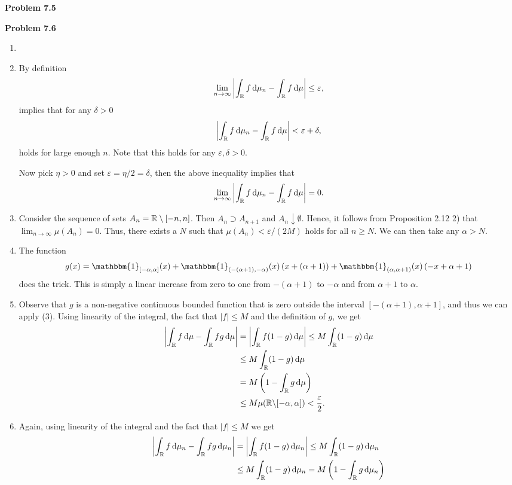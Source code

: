 \bigskip

\textbf{Problem 7.5}

\bigskip

\textbf{Problem 7.6}

\begin{enumerate}[label={(\alph*)}]
\item 
\item By definition
\[
	\lim_{n\to\infty} \left|\int_{\mathbb R} f \, \mathrm{d} \mu_n - \int_{\mathbb R} f \, \mathrm{d} \mu\right| \le \varepsilon,
\]
implies that for any $\delta > 0$
\[
	\left|\int_{\mathbb R} f \, \mathrm{d} \mu_n - \int_{\mathbb R} f \, \mathrm{d} \mu\right| < \varepsilon + \delta,
\]
holds for large enough $n$. Note that this holds for any $\varepsilon, \delta > 0$.

Now pick $\eta > 0$ and set $\varepsilon = \eta/2 = \delta$, then the above inequality implies that
\[
	\lim_{n\to\infty} \left|\int_{\mathbb R} f \, \mathrm{d} \mu_n - \int_{\mathbb R} f \, \mathrm{d} \mu\right| = 0.
\]

\item Consider the sequence of sets $A_n = \mathbb R\setminus [-n,n]$. Then $A_n \supset A_{n + 1}$ and $A_n \downarrow \emptyset$. Hence, it follows from Proposition 2.12 2) that $\lim_{n \to \infty} \mu(A_n) = 0$. Thus, there exists a $N$ such that $\mu(A_n) < \varepsilon/(2M)$ holds for all $n \ge N$. We can then take any $\alpha > N$.
\item The function
\[
	g(x) = \mathbbm{1}_{[-\alpha,\alpha]}(x) + \mathbbm{1}_{(-(\alpha+1), -\alpha)}(x)\left(x + (\alpha + 1)\right) + \mathbbm{1}_{(\alpha,\alpha+1)}(x)\left(-x + \alpha + 1\right)
\]
does the trick. This is simply a linear increase from zero to one from $-(\alpha + 1)$ to $-\alpha$ and from $\alpha + 1$ to $\alpha$.
\item Observe that $g$ is a non-negative continuous bounded function that is zero outside the interval $[-(\alpha+1), \alpha+1]$, and thus we can apply (3).
Using linearity of the integral, the fact that $|f| \le M$ and the definition of $g$, we get
\begin{align*}
	\left|\int_{\mathbb R} f \, \mathrm{d} \mu - \int_{\mathbb R} fg \, \mathrm{d} \mu\right|
	&= \left|\int_{\mathbb R} f (1-g) \, \mathrm{d} \mu\right| \le M \int_{\mathbb R} (1-g) \, \mathrm{d} \mu \\
	&\le M \int_{\mathbb R} (1-g) \, \mathrm{d} \mu \\
	&= M\left(1-\int_{\mathbb R} g \, \mathrm{d} \mu\right) \\
	&\le  M \mu(\mathbb R \backslash [-\alpha,\alpha]) < \frac{\varepsilon}{2}.
\end{align*}
\item Again, using linearity of the integral and the fact that $|f| \le M$ we get
\begin{align*}
	\left|\int_{\mathbb R} f \, \mathrm{d} \mu_n - \int_{\mathbb R} fg \, \mathrm{d} \mu_n\right|
	&= \left|\int_{\mathbb R} f (1-g) \, \mathrm{d} \mu_n\right| \le M \int_{\mathbb R} (1-g) \, \mathrm{d} \mu_n \\
	&\le M \int_{\mathbb R} (1-g) \, \mathrm{d} \mu_n = M\left(1-\int_{\mathbb R} g \, \mathrm{d} \mu_n\right)
\end{align*}


\end{enumerate}
